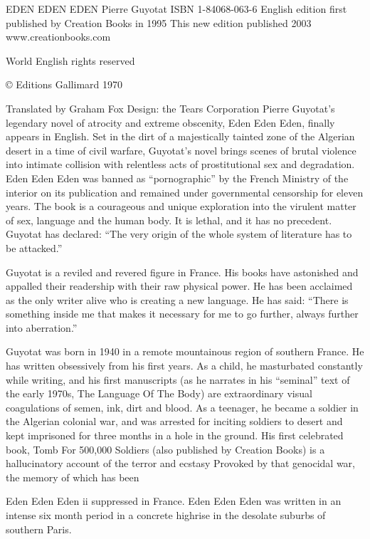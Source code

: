 EDEN EDEN EDEN
Pierre Guyotat
ISBN 1-84068-063-6
English edition first published by Creation Books in 1995
This new edition published 2003
www.creationbooks.com

World English rights reserved

© Editions Gallimard 1970

Translated by Graham Fox
Design: the Tears Corporation
Pierre Guyotat's legendary novel of atrocity and extreme obscenity,
Eden Eden Eden, finally appears in English. Set in the dirt of a
majestically tainted zone of the Algerian desert in a time of civil
warfare, Guyotat’s novel brings scenes of brutal violence into
intimate collision with relentless acts of prostitutional sex and
degradation. Eden Eden Eden was banned as “pornographic” by the
French Ministry of the interior on its publication and remained under
governmental censorship for eleven years. The book is a courageous
and unique exploration into the virulent matter of sex, language and
the human body. It is lethal, and it has no precedent. Guyotat has
declared: “The very origin of the whole system of literature has to
be attacked.”

Guyotat is a reviled and revered figure in France. His books
have astonished and appalled their readership with their raw physical
power. He has been acclaimed as the only writer alive who is creating
a new language. He has said: “There is something inside me that
makes it necessary for me to go further, always further into
aberration.”

Guyotat was born in 1940 in a remote mountainous region
of southern France. He has written obsessively from his first years.
As a child, he masturbated constantly while writing, and his first
manuscripts (as he narrates in his “seminal” text of the early 1970s,
The Language Of The Body) are extraordinary visual coagulations of
semen, ink, dirt and blood. As a teenager, he became a soldier in the
Algerian colonial war, and was arrested for inciting soldiers to desert
and kept imprisoned for three months in a hole in the ground. His
first celebrated book, Tomb For 500,000 Soldiers (also published by
Creation Books) is a hallucinatory account of the terror and ecstasy
Provoked by that genocidal war, the memory of which has been

Eden Eden Eden ii
suppressed in France. Eden Eden Eden was written in an intense six
month period in a concrete highrise in the desolate suburbs of
southern Paris.

